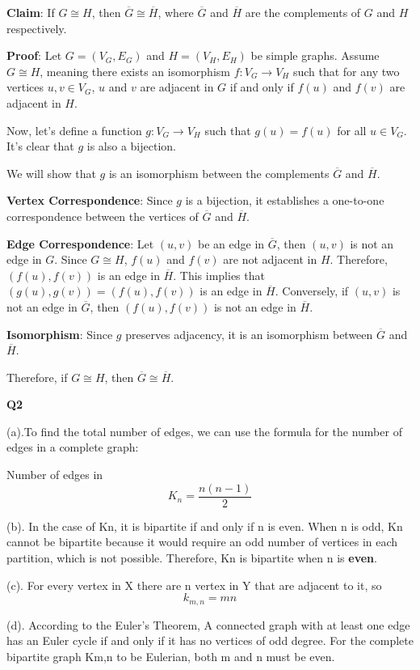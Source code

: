 \documentclass{article}
\begin{document}
\textbf{Claim}: If $G \cong H$, then $\overline{G} \cong \overline{H}$, where $\overline{G}$ and $\overline{H}$ are the complements of $G$ and $H$ respectively.

\textbf{Proof}: Let $G = (V_G, E_G)$ and $H = (V_H, E_H)$ be simple graphs. Assume $G \cong H$, meaning there exists an isomorphism $f: V_G \rightarrow V_H$ such that for any two vertices $u, v \in V_G$, $u$ and $v$ are adjacent in $G$ if and only if $f(u)$ and $f(v)$ are adjacent in $H$.

Now, let's define a function $g: V_G \rightarrow V_H$ such that $g(u) = f(u)$ for all $u \in V_G$. It's clear that $g$ is also a bijection.

We will show that $g$ is an isomorphism between the complements $\overline{G}$ and $\overline{H}$.

\textbf{Vertex Correspondence}: Since $g$ is a bijection, it establishes a one-to-one correspondence between the vertices of $\overline{G}$ and $\overline{H}$.

\textbf{Edge Correspondence}: Let $(u, v)$ be an edge in $\overline{G}$, then $(u, v)$ is not an edge in $G$. Since $G \cong H$, $f(u)$ and $f(v)$ are not adjacent in $H$. Therefore, $(f(u), f(v))$ is an edge in $\overline{H}$. This implies that $(g(u), g(v)) = (f(u), f(v))$ is an edge in $\overline{H}$. Conversely, if $(u, v)$ is not an edge in $\overline{G}$, then $(f(u), f(v))$ is not an edge in $\overline{H}$.

\textbf{Isomorphism}: Since $g$ preserves adjacency, it is an isomorphism between $\overline{G}$ and $\overline{H}$.

Therefore, if $G \cong H$, then $\overline{G} \cong \overline{H}$.

\textbf{Q2}

(a).To find the total number of edges, we can use the formula for the number of edges in a complete graph:

Number of edges in \[K_n =  \frac{n(n-1)}{2} \]

(b).
In the case of Kn, it is bipartite if and only if n is even. When n is odd, Kn cannot be bipartite because it would require an odd number of vertices in each partition, which is not possible. Therefore, Kn is bipartite when n is \textbf{even}.

(c).
For every vertex in X there are n vertex in Y that are adjacent to it, so
\[ k_{m,n} = mn \]

(d).
According to the Euler's Theorem, A connected graph with at least one edge has an Euler cycle if and only if it has
no vertices of odd degree.  For the complete bipartite graph Km,n to be Eulerian, both m and n must be even.
\end{document}
